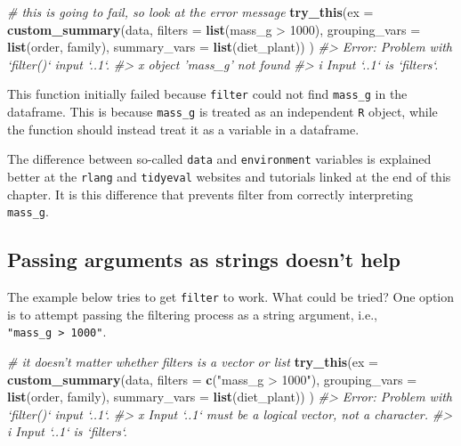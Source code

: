 \documentclass[]{book}
\newenvironment{Shaded}{}{}
\newcommand{\CommentTok}[1]{\textcolor[rgb]{0.38,0.63,0.69}{\textit{#1}}}
\newcommand{\DataTypeTok}[1]{\textcolor[rgb]{0.56,0.13,0.00}{#1}}
\newcommand{\DecValTok}[1]{\textcolor[rgb]{0.25,0.63,0.44}{#1}}
\newcommand{\KeywordTok}[1]{\textcolor[rgb]{0.00,0.44,0.13}{\textbf{#1}}}
\newcommand{\NormalTok}[1]{#1}
\newcommand{\OperatorTok}[1]{\textcolor[rgb]{0.40,0.40,0.40}{#1}}
\newcommand{\StringTok}[1]{\textcolor[rgb]{0.25,0.44,0.63}{#1}}
\begin{document}
\begin{Shaded}
\begin{Highlighting}[]
\CommentTok{# this is going to fail, so look at the error message}
\KeywordTok{try_this}\NormalTok{(}\DataTypeTok{ex =} \KeywordTok{custom_summary}\NormalTok{(data, }
                   \DataTypeTok{filters =} \KeywordTok{list}\NormalTok{(mass_g }\OperatorTok{>}\StringTok{ }\DecValTok{1000}\NormalTok{), }
                   \DataTypeTok{grouping_vars =} \KeywordTok{list}\NormalTok{(order, family),}
                   \DataTypeTok{summary_vars =} \KeywordTok{list}\NormalTok{(diet_plant))}
\NormalTok{         )}
\CommentTok{#> Error: Problem with `filter()` input `..1`.}
\CommentTok{#> x object 'mass_g' not found}
\CommentTok{#> i Input `..1` is `filters`.}
\end{Highlighting}
\end{Shaded}

This function initially failed because \texttt{filter} could not find \texttt{mass\_g} in the dataframe. This is because \texttt{mass\_g} is treated as an independent \texttt{R} object, while the function should instead treat it as a variable in a dataframe.

The difference between so-called \texttt{data} and \texttt{environment} variables is explained better at the \texttt{rlang} and \texttt{tidyeval} websites and tutorials linked at the end of this chapter. It is this difference that prevents filter from correctly interpreting \texttt{mass\_g}.

\hypertarget{passing-arguments-as-strings-doesnt-help}{%
\subsection{Passing arguments as strings doesn't help}\label{passing-arguments-as-strings-doesnt-help}}

The example below tries to get \texttt{filter} to work. What could be tried? One option is to attempt passing the filtering process as a string argument, i.e., \texttt{"mass\_g\ \textgreater{}\ 1000"}.

\begin{Shaded}
\begin{Highlighting}[]
\CommentTok{# it doesn't matter whether filters is a vector or list}
\KeywordTok{try_this}\NormalTok{(}\DataTypeTok{ex =} \KeywordTok{custom_summary}\NormalTok{(data, }
                   \DataTypeTok{filters =} \KeywordTok{c}\NormalTok{(}\StringTok{"mass_g > 1000"}\NormalTok{), }
                   \DataTypeTok{grouping_vars =} \KeywordTok{list}\NormalTok{(order, family),}
                   \DataTypeTok{summary_vars =} \KeywordTok{list}\NormalTok{(diet_plant))}
\NormalTok{         )}
\CommentTok{#> Error: Problem with `filter()` input `..1`.}
\CommentTok{#> x Input `..1` must be a logical vector, not a character.}
\CommentTok{#> i Input `..1` is `filters`.}
\end{Highlighting}
\end{Shaded}
\end{document}

